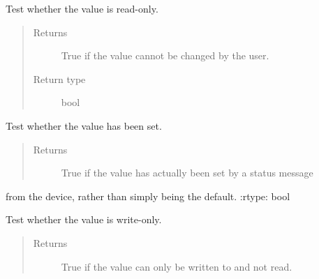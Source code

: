 \documentclass[letterpaper,10pt,english]{sphinxmanual}
\begin{document}
\begin{fulllineitems}
\begin{fulllineitems}
\begin{quote}
\begin{description}
\end{description}\end{quote}

\end{fulllineitems}


\begin{fulllineitems}
\label{value:openzwave.value.ZWaveValue.is_read_only}
Test whether the value is read-only.
\begin{quote}\begin{description}
\item[{Returns}] \leavevmode
True if the value cannot be changed by the user.

\item[{Return type}] \leavevmode
bool

\end{description}\end{quote}

\end{fulllineitems}


\begin{fulllineitems}
\label{value:openzwave.value.ZWaveValue.is_set}
Test whether the value has been set.
\begin{quote}\begin{description}
\item[{Returns}] \leavevmode
True if the value has actually been set by a status message

\end{description}\end{quote}

from the device, rather than simply being the default.
:rtype: bool

\end{fulllineitems}


\begin{fulllineitems}
\label{value:openzwave.value.ZWaveValue.is_write_only}
Test whether the value is write-only.
\begin{quote}\begin{description}
\item[{Returns}] \leavevmode
True if the value can only be written to and not read.


\end{description}
\end{quote}
\end{fulllineitems}
\end{fulllineitems}
\end{document}
